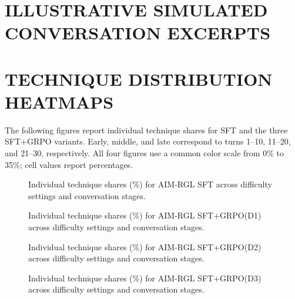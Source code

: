 \clearpage
{}
{}
\stoptocwriting
\chapter{ILLUSTRATIVE SIMULATED CONVERSATION EXCERPTS}
\label{app:conversation-excerpts}
\resumetocwriting



\clearpage
{}
{}
\stoptocwriting
\chapter{TECHNIQUE DISTRIBUTION HEATMAPS}
\label{app:technique-heatmaps}
\resumetocwriting

The following figures report individual technique shares for SFT and the three SFT+GRPO variants. Early, middle, and late correspond to turns 1--10, 11--20, and 21--30, respectively. All four figures use a common color scale from 0\% to 35\%; cell values report percentages.

\begin{figure}[H]
\centering

\caption{Individual technique shares (\%) for AIM-RGL SFT across difficulty settings and conversation stages.}
\label{fig:technique-heatmap-sft}
\end{figure}

\clearpage

\begin{figure}[H]
\centering

\caption{Individual technique shares (\%) for AIM-RGL SFT+GRPO(D1) across difficulty settings and conversation stages.}
\label{fig:technique-heatmap-d1}
\end{figure}

\clearpage

\begin{figure}[H]
\centering

\caption{Individual technique shares (\%) for AIM-RGL SFT+GRPO(D2) across difficulty settings and conversation stages.}
\label{fig:technique-heatmap-d2}
\end{figure}

\clearpage

\begin{figure}[H]
\centering

\caption{Individual technique shares (\%) for AIM-RGL SFT+GRPO(D3) across difficulty settings and conversation stages.}
\label{fig:technique-heatmap-d3}
\end{figure}
